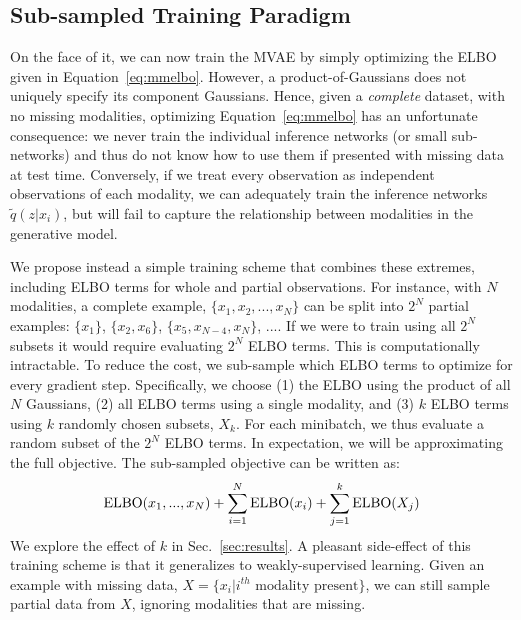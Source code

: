 \subsection{Sub-sampled Training Paradigm}

On the face of it, we can now train the MVAE by simply optimizing the ELBO given in Equation~\ref{eq:mmelbo}.
However, a product-of-Gaussians does not uniquely specify its component Gaussians. Hence, given a \textit{complete} dataset, with no missing modalities, optimizing Equation~\ref{eq:mmelbo} has an unfortunate consequence: we never train the individual inference networks (or small sub-networks) and thus do not know how to use them if presented with missing data at test time.
Conversely, if we treat every observation as independent observations of each modality, we can adequately train the inference networks $\tilde{q}(z|x_{i})$, but will fail to capture the relationship between modalities in the generative model.

We propose instead a simple training scheme that combines these extremes, including ELBO terms for whole and partial observations. For instance, with $N$ modalities, a complete example, $\{x_{1}, x_{2}, ..., x_{N}\}$ can be split into $2^{N}$ partial examples: $\{x_{1}\}$, $\{x_{2}, x_{6}\}$, $\{x_{5}, x_{N-4}, x_{N}\}$, .... If we were to train using all $2^N$ subsets it would require evaluating $2^N$ ELBO terms. This is computationally intractable. To reduce the cost, we sub-sample which ELBO terms to optimize for every gradient step. Specifically, we choose (1) the ELBO using the product of all $N$ Gaussians, (2) all ELBO terms using a single modality, and (3) $k$ ELBO terms using $k$ randomly chosen subsets, $X_k$. For each minibatch, we thus evaluate a random subset of the $2^{N}$ ELBO terms. In expectation, we will be approximating the full objective. The sub-sampled objective can be written as:
\begin{equation}
  \textup{ELBO}(x_1, ..., x_N) + \sum_{i=1}^{N}\textup{ELBO}(x_i) + \sum_{j=1}^{k}\textup{ELBO}(X_j)
  \label{eqn:subsample-elbo}
\end{equation}
We explore the effect of $k$ in Sec.~\ref{sec:results}. A pleasant side-effect of this training scheme is that it generalizes to weakly-supervised learning. Given an example with missing data, $X = \{x_i | \text{$i^{th}$ modality present}\}$, we can still sample partial data from $X$, ignoring modalities that are missing.

